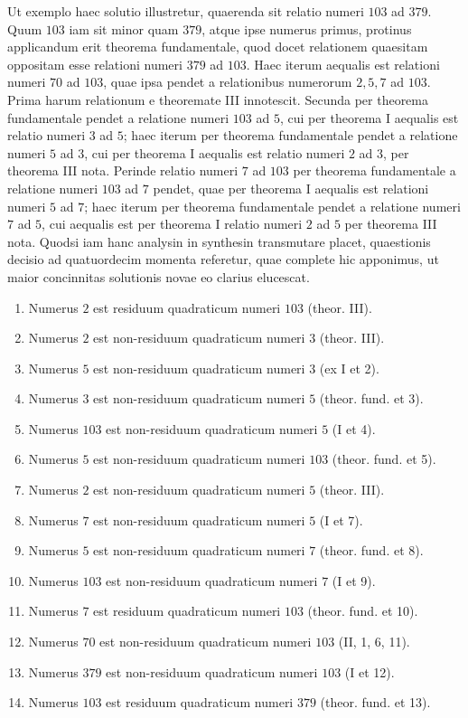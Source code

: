 \documentclass[12pt]{article}
\begin{document}
Ut exemplo haec solutio illustretur, quaerenda sit relatio numeri $103$ ad $379$. Quum $103$ iam sit minor quam $379$, atque ipse numerus primus, protinus applicandum erit theorema fundamentale, quod docet relationem quaesitam oppositam esse relationi numeri $379$ ad $103$. Haec iterum aequalis est relationi numeri $70$ ad $103$, quae ipsa pendet a relationibus numerorum $2,5,7$ ad $103$. Prima harum relationum e theoremate III innotescit. Secunda per theorema fundamentale pendet a relatione numeri $103$ ad $5$, cui per theorema I aequalis est relatio numeri $3$ ad $5$; haec iterum per theorema fundamentale pendet a relatione numeri $5$ ad $3$, cui per theorema I aequalis est relatio numeri $2$ ad $3$, per theorema III nota. Perinde relatio numeri $7$ ad $103$ per theorema fundamentale a relatione numeri $103$ ad $7$ pendet, quae per theorema I aequalis est relationi numeri $5$ ad $7$; haec iterum per theorema fundamentale pendet a relatione numeri $7$ ad $5$, cui aequalis est per theorema I relatio numeri $2$ ad $5$ per theorema III nota. Quodsi iam hanc analysin in synthesin transmutare placet, quaestionis decisio ad quatuordecim momenta referetur, quae complete hic apponimus, ut maior concinnitas solutionis novae eo clarius elucescat.

\begin{enumerate}
\item Numerus $2$ est residuum quadraticum numeri $103$ (theor. III).
\item Numerus $2$ est non-residuum quadraticum numeri $3$ (theor. III).
\item Numerus $5$ est non-residuum quadraticum numeri $3$ (ex I et 2).
\item Numerus $3$ est non-residuum quadraticum numeri $5$ (theor. fund. et 3).
\item Numerus $103$ est non-residuum quadraticum numeri $5$ (I et 4).
\item Numerus $5$ est non-residuum quadraticum numeri $103$ (theor. fund. et 5).
\item Numerus $2$ est non-residuum quadraticum numeri $5$ (theor. III).
\item Numerus $7$ est non-residuum quadraticum numeri $5$ (I et 7).
\item Numerus $5$ est non-residuum quadraticum numeri $7$ (theor. fund. et 8).
\item Numerus $103$ est non-residuum quadraticum numeri $7$ (I et 9).
\item Numerus $7$ est residuum quadraticum numeri $103$ (theor. fund. et 10).
\item Numerus $70$ est non-residuum quadraticum numeri $103$ (II, 1, 6, 11).
\item Numerus $379$ est non-residuum quadraticum numeri $103$ (I et 12).
\item Numerus $103$ est residuum quadraticum numeri $379$ (theor. fund. et 13).
\end{enumerate}
\end{document}
